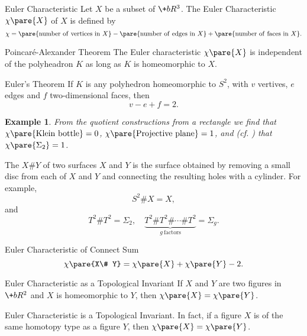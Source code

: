 \documentclass[hidelinks]{article}
\newtheorem{example}{Example}
\begin{document}
\begin{termdef}{Euler Characteristic}
    Let $X$ be a subset of $\+bR^3$. The Euler Characteristic $\chi\pare{X}$ of $X$ is defined by
    \begin{equation*}
        \chi = \pare{\mathrm{number\ of\ vertices\ in\ }X} - \pare{\mathrm{number\ of\ edges\ in\ } X} + \pare{\mathrm{number\ of\ faces\ in\ }X}.
    \end{equation*}
\end{termdef}
\begin{finaleq}{Poincar\'e-Alexander Theorem}
    The Euler characteristic $\chi\pare{X}$ is independent of the polyheadron $K$ as long as $K$ is homeomorphic to $X$.
\end{finaleq}
\begin{finaleq}{Euler's Theorem}
    If $K$ is any polyhedron homeomorphic to $S^2$, with $v$ vertives, $e$ edges and $f$ two-dimensional faces, then
    \[ v-e+f=2. \]
\end{finaleq}
\begin{sample}
    \begin{example}
        From the quotient constructions from a rectangle we find that $\chi\pare{\mathrm{Klein\ bottle}} = 0$, $\chi\pare{\mathrm{Projective\ plane}} = 1$, and (cf. ) that $\chi\pare{\Sigma_2} = 1$.
    \end{example}
\end{sample}
The  $X\# Y$ of two surfaces $X$ and $Y$ is the surface obtained by removing a small disc from each of $X$ and $Y$ and connecting the resulting holes with a cylinder. For example,
\[ S^2 \# X = X, \]
and
\[ T^2 \# T^2 = \Sigma_2,\quad \underbrace{T^2\# T^2\# \cdots \# T^2}_{g\mathrm{\ factors}} = \Sigma_g. \]
\begin{finaleq}{Euler Characteristic of Connect Sum}
    \[ \chi\pare{X\# Y} = \chi\pare{X} + \chi\pare{Y} - 2. \]
\end{finaleq}
\begin{finaleq}{Euler Characteristic as a Topological Invariant}
    If $X$ and $Y$ are two figures in $\+bR^2$ and $X$ is homeomorphic to $Y$, then $\chi\pare{X} = \chi\pare{Y}$.
\end{finaleq}
Euler Characteristic is a Topological Invariant. In fact, if a figure $X$ is of the same homotopy type as a figure $Y$, then $\chi\pare{X} = \chi\pare{Y}$.



\end{document}
